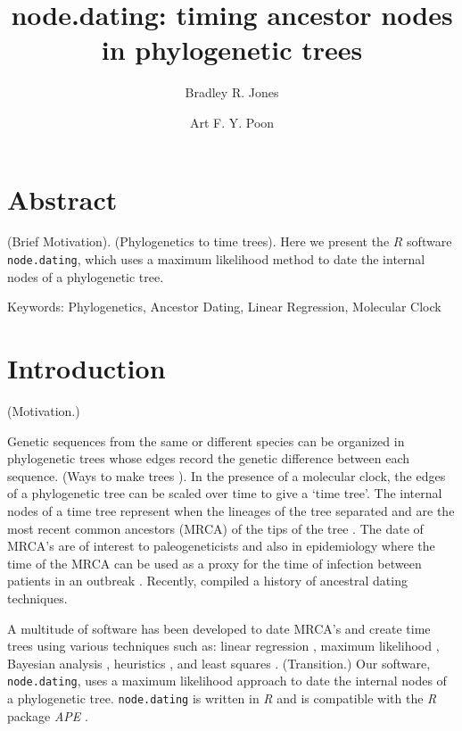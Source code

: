 \documentclass[12pt]{article}
\newcommand{\code}[1]{{\tt #1}}
\begin{document}
\title{node.dating: timing ancestor nodes in phylogenetic trees}

\author[1, 2, *]{Bradley R. Jones}
\author[2, 3]{Art F. Y. Poon}
\baselineskip 22pt
\pagewiselinenumbers

\date{}
\maketitle

\section * {Abstract}
(Brief Motivation).
(Phylogenetics to time trees).
Here we present the $R$ software \code{node.dating}, which uses a maximum likelihood method to date the internal nodes of a phylogenetic tree.

Keywords: 
Phylogenetics, Ancestor Dating, Linear Regression, Molecular Clock \\

\underline{}
\section*{Introduction} \label{sec:intro}
(Motivation.)

Genetic sequences from the same or different species can be organized in phylogenetic trees whose edges record the genetic difference between each sequence.
(Ways to make trees \citep{Raxml14}).
In the presence of a molecular clock, the edges of a phylogenetic tree can be scaled over time to give a `time tree'.
The internal nodes of a time tree represent when the lineages of the tree separated and are the most recent common ancestors (MRCA) of the tips of the tree \citep{}.
The date of MRCA's are of interest to paleogeneticists \citep{} and also in epidemiology where the time of the MRCA can be used as a proxy for the time of infection between patients in an outbreak \citep{}. Recently, \cite{Kumar16} compiled a history of ancestral dating techniques.

A multitude of software has been developed to date MRCA's and create time trees using various techniques such as: linear regression \citep{Tempest}, maximum likelihood \citep{TipDates, r8ts, PAML}, Bayesian analysis \citep{BEAST}, heuristics \citep{UPGMA, TREBLE}, and least squares \citep{LSD}.
(Transition.)
Our software, \code{node.dating}, uses a maximum likelihood approach to date the internal nodes of a phylogenetic tree.
\code{node.dating} is written in \emph{R} and is compatible with the \emph{R} package \emph{APE} \citep{APE}.
\end{document}
